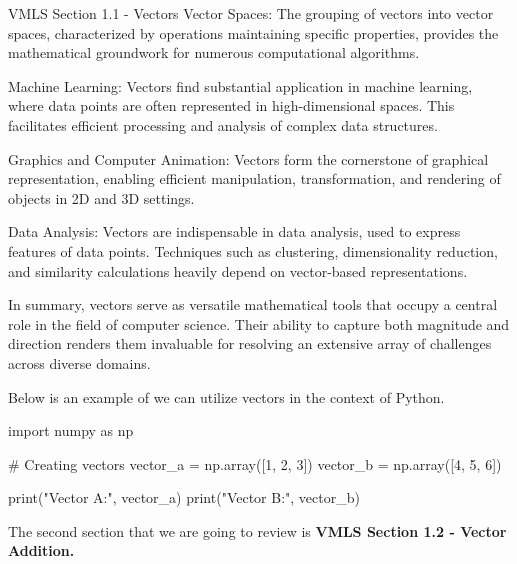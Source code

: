 \begin{notes}{VMLS Section 1.1 - Vectors}
    Vector Spaces: The grouping of vectors into vector spaces, characterized by operations maintaining specific properties, provides the mathematical groundwork for numerous computational algorithms.

    Machine Learning: Vectors find substantial application in machine learning, where data points are often represented in high-dimensional spaces. This facilitates efficient processing and analysis 
    of complex data structures.

    Graphics and Computer Animation: Vectors form the cornerstone of graphical representation, enabling efficient manipulation, transformation, and rendering of objects in 2D and 3D settings.

    Data Analysis: Vectors are indispensable in data analysis, used to express features of data points. Techniques such as clustering, dimensionality reduction, and similarity calculations heavily 
    depend on vector-based representations.

    In summary, vectors serve as versatile mathematical tools that occupy a central role in the field of computer science. Their ability to capture both magnitude and direction renders them invaluable 
    for resolving an extensive array of challenges across diverse domains.
    
    \begin{highlight}
        Below is an example of we can utilize vectors in the context of Python.

    \begin{code}[Python]
    import numpy as np

    # Creating vectors
    vector_a = np.array([1, 2, 3])
    vector_b = np.array([4, 5, 6])

    print("Vector A:", vector_a)
    print("Vector B:", vector_b)
    \end{code}
    \end{highlight}
\end{notes}

The second section that we are going to review is \textbf{VMLS Section 1.2 - Vector Addition.}

